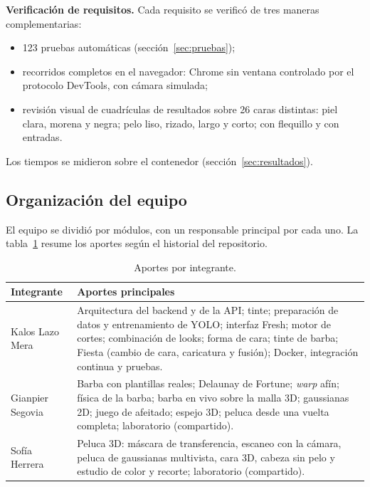 \textbf{Verificación de requisitos.} Cada requisito se verificó de tres maneras complementarias:
\begin{itemize}
  \item 123 pruebas automáticas (sección~\ref{sec:pruebas});
  \item recorridos completos en el navegador: Chrome sin ventana controlado por el protocolo DevTools, con cámara simulada;
  \item revisión visual de cuadrículas de resultados sobre 26 caras distintas: piel clara, morena y negra; pelo liso, rizado, largo y corto; con flequillo y con entradas.
\end{itemize}
Los tiempos se midieron sobre el contenedor (sección~\ref{sec:resultados}).

\subsection{Organización del equipo}

El equipo se dividió por módulos, con un responsable principal por cada uno. La tabla~\ref{tab:aportes} resume los aportes según el historial del repositorio.

\begin{table}[ht]
\centering
\small
\begin{tabularx}{\linewidth}{@{}l X@{}}
\toprule
Integrante & Aportes principales \\
\midrule
Kalos Lazo Mera & Arquitectura del backend y de la API; tinte; preparación de datos y entrenamiento de YOLO; interfaz Fresh; motor de cortes; combinación de looks; forma de cara; tinte de barba; Fiesta (cambio de cara, caricatura y fusión); Docker, integración continua y pruebas. \\
Gianpier Segovia & Barba con plantillas reales; Delaunay de Fortune; \emph{warp} afín; física de la barba; barba en vivo sobre la malla 3D; gaussianas 2D; juego de afeitado; espejo 3D; peluca desde una vuelta completa; laboratorio (compartido). \\
Sofía Herrera & Peluca 3D: máscara de transferencia, escaneo con la cámara, peluca de gaussianas multivista, cara 3D, cabeza sin pelo y estudio de color y recorte; laboratorio (compartido). \\
\bottomrule
\end{tabularx}
\caption{Aportes por integrante.}
\label{tab:aportes}
\end{table}
